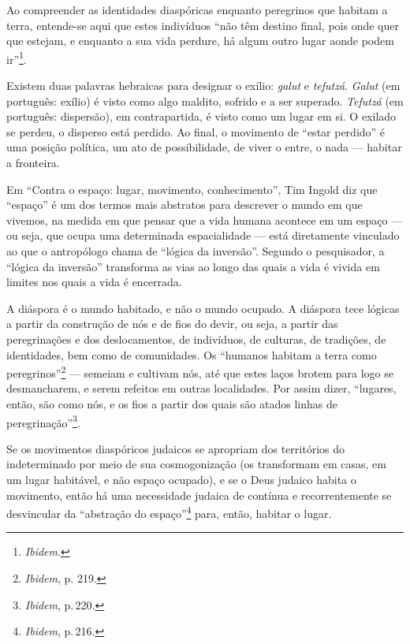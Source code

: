 
Ao compreender as identidades diaspóricas enquanto peregrinos que
habitam a terra, entende-se aqui que estes indivíduos ``não têm
destino final, pois onde quer que estejam, e enquanto a sua vida
perdure, há algum outro lugar aonde podem ir''\footnote{\emph{Ibidem}.}.

Existem duas palavras hebraicas para designar o exílio: \emph{galut} e
\emph{tefutzá}. \emph{Galut} (em português: exílio) é visto como algo
maldito, sofrido e a ser superado. \emph{Tefutzá} (em português:
dispersão), em contrapartida, é visto como um lugar em si. O exilado se
perdeu, o disperso está perdido. Ao final, o movimento de ``estar
perdido'' é uma posição política, um ato de possibilidade, de viver o
entre, o nada --- habitar a fronteira.

\begin{center}\end{center}

\noindent{}Em ``Contra o espaço: lugar, movimento, conhecimento'', Tim Ingold diz
que ``espaço'' é um dos termos mais abstratos para descrever o mundo em
que vivemos, na medida em que pensar que a vida humana acontece em um
espaço --- ou seja, que ocupa uma determinada espacialidade --- está
diretamente vinculado ao que o antropólogo chama de ``lógica da
inversão''. Segundo o pesquisador, a ``lógica da inversão''
transforma as vias ao longo das quais a vida é vivida em limites nos
quais a vida é encerrada.

A diáspora é o mundo habitado, e não o mundo ocupado. A diáspora tece
lógicas a partir da construção de nós e de fios do devir, ou seja, a
partir das peregrinações e dos deslocamentos, de indivíduos, de
culturas, de tradições, de identidades, bem como de comunidades. Os
``humanos habitam a terra como peregrinos''\footnote{\emph{Ibidem}, p.
  219.} --- semeiam e cultivam nós, até que estes laços brotem para logo
se desmancharem, e serem refeitos em outras localidades. Por assim
dizer, ``lugares, então, são como nós, e os fios a partir dos
quais são atados linhas de peregrinação''\footnote{\emph{Ibidem}, p.\,220.}.

Se os movimentos diaspóricos judaicos se apropriam dos territórios do
indeterminado por meio de sua cosmogonização (os transformam em casas,
em um lugar habitável, e não espaço ocupado), e se o Deus judaico habita
o movimento, então há uma necessidade judaica de contínua e
recorrentemente se desvincular da ``abstração do
espaço''\footnote{\emph{Ibidem}, p.\,216.} para, então, habitar o lugar.


